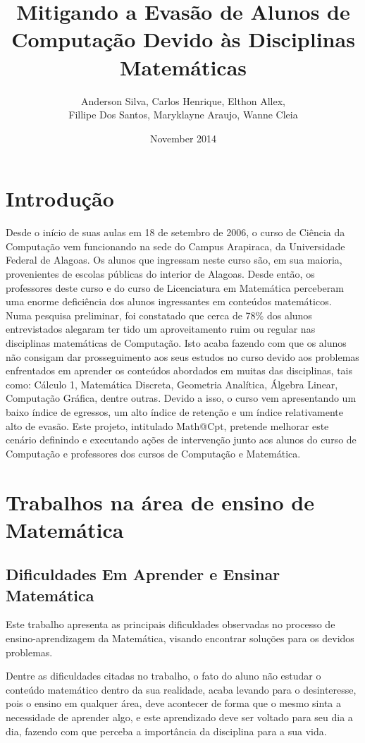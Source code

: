 \documentclass[12pt,a4paper]{article}
\title{Mitigando a Evasão de Alunos de Computação Devido às Disciplinas Matemáticas}
\author{Anderson Silva, Carlos Henrique, Elthon Allex,
\\ Fillipe Dos Santos, Maryklayne Araujo, Wanne Cleia}
\date{November 2014}
\begin{document}
 

\maketitle

\section{Introdução}
Desde o início de suas aulas em 18 de setembro de 2006, o curso de Ciência da Computação vem funcionando na sede do Campus Arapiraca, da Universidade Federal de Alagoas. Os alunos que ingressam neste curso são, em sua maioria, provenientes de escolas públicas do interior de Alagoas. Desde então, os professores deste curso e do curso de Licenciatura em Matemática perceberam uma enorme deficiência dos alunos ingressantes em conteúdos matemáticos. Numa pesquisa preliminar, foi constatado que cerca de 78\% dos alunos entrevistados alegaram ter tido um  aproveitamento ruim ou regular nas disciplinas matemáticas de Computação. Isto acaba fazendo com que os alunos não consigam dar prosseguimento aos seus estudos no curso devido aos problemas enfrentados em aprender os conteúdos abordados em muitas das disciplinas, tais como: Cálculo 1, Matemática Discreta, Geometria Analítica, Álgebra Linear, Computação Gráfica, dentre outras. Devido a isso, o curso vem apresentando um baixo índice de egressos, um alto índice de retenção e um índice relativamente alto de evasão. Este projeto, intitulado Math@Cpt, pretende melhorar este cenário definindo e executando ações de intervenção junto aos alunos do curso de Computação e professores dos cursos de Computação e Matemática.

\section{Trabalhos na área de ensino de Matemática}

\subsection{Dificuldades Em Aprender e Ensinar Matemática}
Este trabalho apresenta as principais dificuldades observadas no processo de ensino-aprendizagem da Matemática, visando encontrar soluções para os devidos problemas.

Dentre as dificuldades citadas no trabalho, o fato do aluno não estudar o conteúdo matemático dentro da sua realidade, acaba levando para o desinteresse, pois o ensino em qualquer área, deve acontecer de forma que o mesmo sinta a necessidade de aprender algo, e este aprendizado deve ser voltado para seu dia a dia, fazendo com que perceba a importância da disciplina para a sua vida. 
\end{document}
